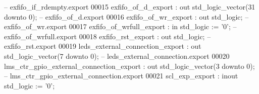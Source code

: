 \begin{DoxyCode}
{       --                exfifo\_if\_rdempty.export}
00015         \textcolor{vhdlchar}{exfifo_of_d_export}                      \textcolor{vhdlchar}{:} \textcolor{keywordflow}{out}   \textcolor{comment}{std\_logic\_vector}\textcolor{vhdlchar}{(}\textcolor{vhdllogic}{}\textcolor{vhdllogic}{31} \textcolor{keywordflow}{downto} \textcolor{vhdllogic}{}\textcolor{vhdllogic}{0}\textcolor{vhdlchar}{)};\textcolor{keyword}{                   
       --                      exfifo\_of\_d.export}
00016         \textcolor{vhdlchar}{exfifo_of_wr_export}                     \textcolor{vhdlchar}{:} \textcolor{keywordflow}{out}   \textcolor{comment}{std\_logic};\textcolor{keyword}{                                       
       --                     exfifo\_of\_wr.export}
00017         \textcolor{vhdlchar}{exfifo_of_wrfull_export}                 \textcolor{vhdlchar}{:} \textcolor{keywordflow}{in}    \textcolor{comment}{std\_logic}                     \textcolor{vhdlchar}{:=} \textcolor{vhdlchar}{'}\textcolor{vhdllogic}{}\textcolor{vhdllogic}{0}\textcolor{vhdlchar}{'};\textcolor{keyword}{            
       --                 exfifo\_of\_wrfull.export}
00018         \textcolor{vhdlchar}{exfifo_rst_export}                       \textcolor{vhdlchar}{:} \textcolor{keywordflow}{out}   \textcolor{comment}{std\_logic};\textcolor{keyword}{                                       
       --                       exfifo\_rst.export}
00019         \textcolor{vhdlchar}{leds_external_connection_export}         \textcolor{vhdlchar}{:} \textcolor{keywordflow}{out}   \textcolor{comment}{std\_logic\_vector}\textcolor{vhdlchar}{(}\textcolor{vhdllogic}{}\textcolor{vhdllogic}{7} \textcolor{keywordflow}{downto} \textcolor{vhdllogic}{}\textcolor{vhdllogic}{0}\textcolor{vhdlchar}{)};\textcolor{keyword}{                    
       --         leds\_external\_connection.export}
00020         \textcolor{vhdlchar}{lms_ctr_gpio_external_connection_export} \textcolor{vhdlchar}{:} \textcolor{keywordflow}{out}   \textcolor{comment}{std\_logic\_vector}\textcolor{vhdlchar}{(}\textcolor{vhdllogic}{}\textcolor{vhdllogic}{3} \textcolor{keywordflow}{downto} \textcolor{vhdllogic}{}\textcolor{vhdllogic}{0}\textcolor{vhdlchar}{)};\textcolor{keyword}{                    
       -- lms\_ctr\_gpio\_external\_connection.export}
00021         \textcolor{vhdlchar}{scl_exp_export}                          \textcolor{vhdlchar}{:} \textcolor{keywordflow}{inout} \textcolor{comment}{std\_logic}                     \textcolor{vhdlchar}{:=} \textcolor{vhdlchar}{'}\textcolor{vhdllogic}{}\textcolor{vhdllogic}{0}\textcolor{vhdlchar}{'};\textcolor{keyword}{            
}
\end{DoxyCode}
